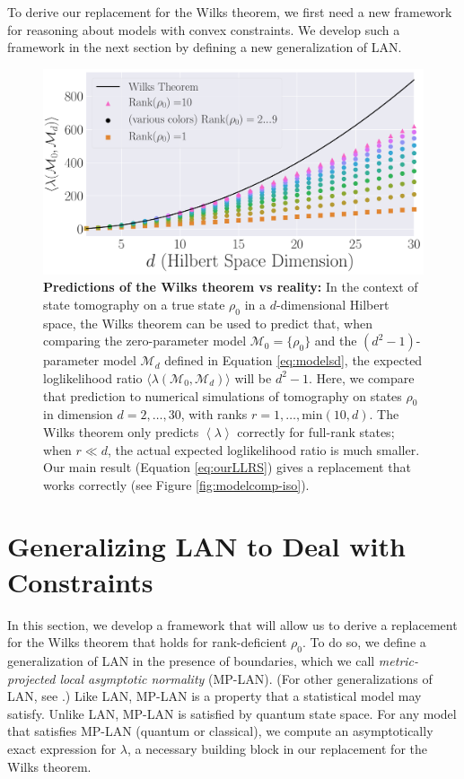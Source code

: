 \documentclass[aps,pra, twocolumn]{revtex4-1}
\newcommand{\M}{\mathcal{M}}
\newcommand{\expect}[1]{\ensuremath{\left\langle#1\right\rangle}}
\begin{document}
To derive our replacement for the Wilks theorem, we first need a new framework for reasoning about models with convex constraints. We develop such a framework in the next section by defining a new generalization of LAN.

\begin{figure}
\includegraphics[width=\columnwidth]{Images/Figure_2.pdf}
 \caption{\textbf{Predictions of the Wilks theorem vs reality:}  In the context of state tomography on a true state $\rho_0$ in a $d$-dimensional Hilbert space, the Wilks theorem can be used to predict that, when comparing the zero-parameter model $\M_{0} = \{\rho_0\}$ and the $(d^2-1)$-parameter model $\mathcal{M}_d$ defined in Equation \eqref{eq:modelsd}, the expected loglikelihood ratio $\langle \lambda(\M_{0}, \M_{d})\rangle$ will be $d^2-1$.  Here, we compare that prediction to numerical simulations of tomography on states $\rho_0$ in dimension $d=2,\ldots,30$, with ranks $r=1,\ldots,\mathrm{min}(10,d)$.  The Wilks theorem only predicts $\expect{\lambda}$ correctly for full-rank states; when $r \ll d$, the actual expected loglikelihood ratio is much smaller. Our main result (Equation \ref{eq:ourLLRS}) gives a replacement that works correctly (see Figure \ref{fig:modelcomp-iso}).}
\label{fig:boundaries2}
\end{figure}

\section{Generalizing LAN to Deal with Constraints}
\label{sec:lanreplacement}

In this section, we develop a framework that will allow us to derive a replacement for the Wilks theorem that holds for rank-deficient $\rho_{0}$. To do so, we define a generalization of LAN in the presence of boundaries, which we call \emph{metric-projected local asymptotic normality} (MP-LAN). (For other generalizations of LAN, see \cite{Roussas2010, Jeganathan1982}.) Like LAN, MP-LAN is a property that a statistical model may satisfy. Unlike LAN, MP-LAN is satisfied by quantum state space. For any model that satisfies MP-LAN (quantum or classical), we compute an asymptotically exact expression for $\lambda$, a necessary building block in our replacement for the Wilks theorem. 
\end{document}

